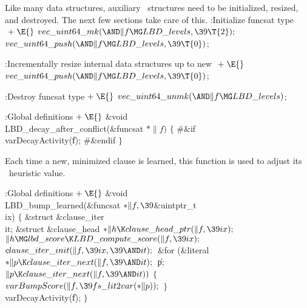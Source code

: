 {{{{{Like many data structures, auxiliary \LBD\ structures need to be
initialized,
resized, and destroyed. The next few sections take care of this.
\Y\B\4:Initialize funcsat type\X${}\mathrel+\E{}$\6
$\\{vec\_uint64\_mk}({\AND}\|f\MG\\{LBD\_levels},\39\T{2});{}$\6
${}\\{vec\_uint64\_push}({\AND}\|f\MG\\{LBD\_levels},\39\T{0}){}$;\par
\fi

\Y\B\4:Incrementally resize internal data structures up to new \X${}\mathrel+\E{}$\6
$\\{vec\_uint64\_push}({\AND}\|f\MG\\{LBD\_levels},\39\T{0}){}$;\par
\fi

\Y\B\4:Destroy funcsat type\X${}\mathrel+\E{}$\6
$\\{vec\_uint64\_unmk}({\AND}\|f\MG\\{LBD\_levels}){}$;\par
\fi

\Y\B\4:Global definitions\X${}\mathrel+\E{}$\6
\&{void} \\{LBD\_decay\_after\_conflict}(\&{funcsat} ${}{*}\|f){}$\1\1\2\2\6
${}\{{}$\6
\8\#\&{if} \1\6
\\{varDecayActivity}(\|f);\6
\8\#\&{endif}\6
\4${}\}{}$\2\par
\fi

Each time a new, minimized clause is learned, this function is used to
adjust
its \LBD\ heuristic value.

\Y\B\4:Global definitions\X${}\mathrel+\E{}$\6
\&{void} \\{LBD\_bump\_learned}(\&{funcsat} ${}{*}\|f,\39{}$\&{uintptr\_t} %
\\{ix})\1\1\2\2\6
${}\{{}$\1\6
\&{struct} \&{clause\_iter} \\{it};\6
\&{struct} \&{clause\_head} ${}{*}\|h\K\\{clause\_head\_ptr}(\|f,\39\\{ix});{}$%
\7
${}\|h\MG\\{lbd\_score}\K\\{LBD\_compute\_score}(\|f,\39\\{ix});{}$\6
${}\\{clause\_iter\_init}(\|f,\39\\{ix},\39{\AND}\\{it});{}$\6
\&{for} (\&{literal} ${}{*}\|p\K\\{clause\_iter\_next}(\|f,\39{\AND}\\{it});{}$
\|p; ${}\|p\K\\{clause\_iter\_next}(\|f,\39{\AND}\\{it})){}$\5
${}\{{}$\1\6
${}\\{varBumpScore}(\|f,\39\\{fs\_lit2var}({*}\|p));{}$\6
\4${}\}{}$\2\6
\\{varDecayActivity}(\|f);\6
\4${}\}{}$\2\par
\fi

}}}}}
